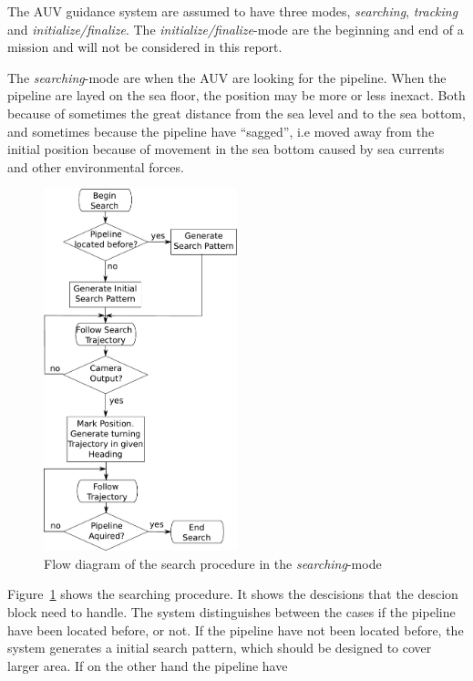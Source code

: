 	The AUV guidance system are assumed to have three modes, \textit{searching}, \textit{tracking} and
	\textit{initialize/finalize}. The \textit{initialize/finalize}-mode are the beginning and end of a
	mission and will not be considered in this report. 
	
	The \textit{searching}-mode are when the AUV are looking for the pipeline. When the pipeline are layed
	on the sea floor, the position may be more or less inexact. Both because of sometimes the great 
	distance from the sea level and to the sea bottom, and sometimes because the pipeline have ``sagged'', 
	i.e moved away from the initial position because of movement in the sea bottom caused by sea currents
	and other environmental forces. 

	\begin{figure}[htbp]
		\centering
		\includegraphics[width=0.5\textwidth]{pics/search_flow}
		\caption{Flow diagram of the search procedure in the \textit{searching}-mode}
		\label{fig:ch2-search-flow}
	\end{figure}
	Figure~\ref{fig:ch2-search-flow} shows the searching procedure. It shows the descisions that the
	descion block need to handle. The system distinguishes between the cases if the pipeline have been
	located before, or not. If the pipeline have not been located before, the system generates a initial
	search pattern, which should be designed to cover larger area. If on the other hand the pipeline have
